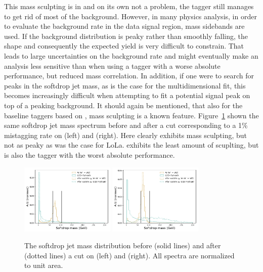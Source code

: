 This mass sculpting is in and on its own not a problem, the tagger still manages to get rid of most of the background. However, in many physics analysis, in order to evaluate the background rate in the data signal region, mass sidebands are used. If the background distribution is peaky rather than smoothly falling, the shape and consequently the expected yield is very difficult to constrain. That leads to large uncertainties on the background rate and might eventually make an analysis less sensitive than when using a tagger with a worse absolute performance, but reduced mass correlation. In addition, if one were to search for peaks in the softdrop jet mass, as is the case for the multidimensional fit, this becomes increasingly difficult when attempting to fit a potential signal peak on top of a peaking background.\newline
It should again be mentioned, that also for the baseline taggers based on \nsubj, mass sculpting is a known feature. Figure~\ref{fig:lola:masssculpttau} shown the same softdrop jet mass spectrum before and after a cut corresponding to a 1\% mistagging rate on \nsubj (left) and \ddt (right). Here \nsubj clearly exhibits mass sculpting, but not as peaky as was the case for LoLa. \ddt exhibits the least amount of scuplting, but is also the tagger with the worst absolute performance.\par 
\begin{figure}[h!]
\centering
\includegraphics[width=0.4\textwidth]{figures/vtagging/lola/wLola_v6_500rew-mass-afterCut-ddt_normed.png}
\includegraphics[width=0.4\textwidth]{figures/vtagging/lola/wLola_v6_500rew-mass-afterCut-jtau21_normed.png}
\caption{The softdrop jet mass distribution before (solid lines) and after (dotted lines) a cut on \nsubj (left) and \ddt (right). All spectra are normalized to unit area.}
\label{fig:lola:masssculpttau}
\end{figure}

